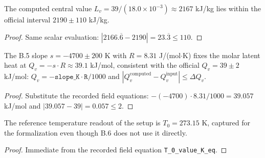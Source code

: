 \begin{theorem}
\label{thm:IPhO2026Problems_problem_IPhO_2026_4_B_6:computed_value_within_official_uncertainty}
The computed central value $L_v = 39/(18.0 \times 10^{-3}) \approx 2167$
kJ/kg lies within the official interval $2190 \pm 110$ kJ/kg.
\end{theorem}
\begin{proof}
Same scalar evaluation:
$|2166.\overline{6} - 2190| = 23.\overline{3} \le 110$.
\end{proof}

\begin{lemma}
\label{lem:IPhO2026Problems_problem_IPhO_2026_4_B_6:qv_from_clausius_clapeyron_slope}
The B.5 slope $s = -4700 \pm 200$ K with $R = 8.31$ J/(mol$\cdot$K) fixes
the molar latent heat at $Q_v = -s \cdot R \approx 39.1$ kJ/mol, consistent
with the official $Q_v = 39 \pm 2$ kJ/mol:
$Q_v = -\mathtt{slope\_K}\cdot\mathtt{R}/1000$ and
$|Q_v^{\mathrm{computed}} - Q_v^{\mathrm{input}}| \le \Delta Q_v$.
\end{lemma}
\begin{proof}
Substitute the recorded field equations: $-(-4700)\cdot 8.31/1000 = 39.057$
kJ/mol and $|39.057 - 39| = 0.057 \le 2$.
\end{proof}

\begin{lemma}
\label{lem:IPhO2026Problems_problem_IPhO_2026_4_B_6:reference_temperature_calibration}
The reference temperature readout of the setup is
$T_0 = 273.15$ K, captured for the formalization even though B.6 does not
use it directly.
\end{lemma}
\begin{proof}
Immediate from the recorded field equation
\texttt{T\_0\_value\_K\_eq}.
\end{proof}


